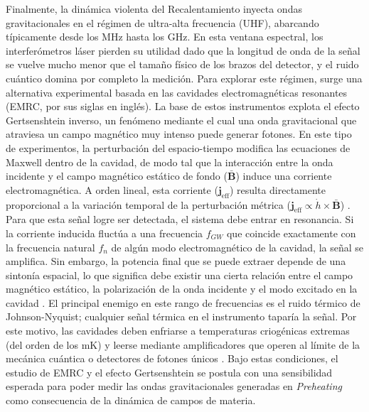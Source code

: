 Finalmente, la dinámica violenta del Recalentamiento inyecta ondas gravitacionales en el régimen de ultra-alta frecuencia (UHF), abarcando típicamente desde los MHz hasta los GHz. En esta ventana espectral, los interferómetros láser pierden su utilidad dado que la longitud de onda de la señal se vuelve mucho menor que el tamaño físico de los brazos del detector, y el ruido cuántico domina por completo la medición. Para explorar este régimen, surge una alternativa experimental basada en las cavidades electromagnéticas resonantes (EMRC, por sus siglas en inglés). La base de estos instrumentos explota el efecto Gertsenshtein inverso, un fenómeno mediante el cual una onda gravitacional que atraviesa un campo magnético muy intenso puede generar fotones. En este tipo de experimentos, la perturbación del espacio-tiempo modifica las ecuaciones de Maxwell dentro de la cavidad, de modo tal que la interacción entre la onda incidente y el campo magnético estático de fondo ($\bar{\textbf{B}}$) induce una corriente electromagnética. A orden lineal, esta corriente ($\textbf{j}_{\text{eff}}$) resulta directamente proporcional a la variación temporal de la perturbación métrica ($\textbf{j}_{\text{eff}} \propto \dot{h} \times \bar{\textbf{B}}$) \cite{Berlin_2023}. Para que esta señal logre ser detectada, el sistema debe entrar en resonancia. Si la corriente inducida fluctúa a una frecuencia $f_{GW}$ que coincide exactamente con la frecuencia natural $f_n$ de algún modo electromagnético de la cavidad, la señal se amplifica. Sin embargo, la potencia final que se puede extraer depende de una sintonía espacial, lo que significa debe existir una cierta relación entre el campo magnético estático, la polarización de la onda incidente y el modo excitado en la cavidad \cite{Mohanty_2026, Herman_2023}. El principal enemigo en este rango de frecuencias es el ruido térmico de Johnson-Nyquist; cualquier señal térmica en el instrumento taparía la señal. Por este motivo, las cavidades deben enfriarse a temperaturas criogénicas extremas (del orden de los mK) y leerse mediante amplificadores que operen al límite de la mecánica cuántica o detectores de fotones únicos \cite{Aggarwal_2020}. Bajo estas condiciones, el estudio de EMRC y el efecto Gertsenshtein se postula con una sensibilidad esperada para poder medir las ondas gravitacionales generadas en \textit{Preheating} como consecuencia de la dinámica de campos de materia.